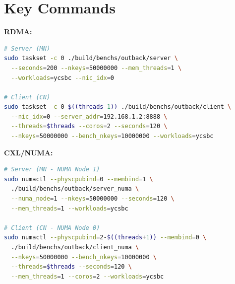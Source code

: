 \documentclass[conference]{IEEEtran}
\begin{document}
\section{Key Commands}

\textbf{RDMA:}
\begin{lstlisting}[language=bash]
# Server (MN)
sudo taskset -c 0 ./build/benchs/outback/server \
  --seconds=200 --nkeys=50000000 --mem_threads=1 \
  --workloads=ycsbc --nic_idx=0

# Client (CN)
sudo taskset -c 0-$((threads-1)) ./build/benchs/outback/client \
  --nic_idx=0 --server_addr=192.168.1.2:8888 \
  --threads=$threads --coros=2 --seconds=120 \
  --nkeys=50000000 --bench_nkeys=10000000 --workloads=ycsbc
\end{lstlisting}

\textbf{CXL/NUMA:}
\begin{lstlisting}[language=bash]
# Server (MN - NUMA Node 1)
sudo numactl --physcpubind=0 --membind=1 \
  ./build/benchs/outback/server_numa \
  --numa_node=1 --nkeys=50000000 --seconds=120 \
  --mem_threads=1 --workloads=ycsbc

# Client (CN - NUMA Node 0)
sudo numactl --physcpubind=2-$((threads+1)) --membind=0 \
  ./build/benchs/outback/client_numa \
  --nkeys=50000000 --bench_nkeys=10000000 \
  --threads=$threads --seconds=120 \
  --mem_threads=1 --coros=2 --workloads=ycsbc
\end{lstlisting}
\end{document}
